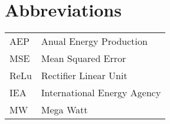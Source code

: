 \chapter{Abbreviations}

\begin{table}[H]
    \centering
    \renewcommand{\arraystretch}{2}
    \begin{tabular}{ll}
		AEP & Anual Energy Production \\
		MSE & Mean Squared Error \\
		ReLu & Rectifier Linear Unit \\
		IEA & International Energy Agency \\
		MW  & Mega Watt
    \end{tabular}
\end{table}

\makeatletter
{}
\makeatother